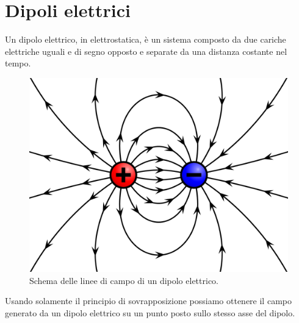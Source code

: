 \documentclass[
10pt, %
a4paper, %
oneside, %
headinclude,footinclude, %
BCOR5mm, %
]{scrartcl}
\begin{document}
\section{Dipoli elettrici}
\begin{definizione}
	Un dipolo elettrico, in elettrostatica, è un sistema composto da due cariche elettriche uguali e di segno opposto e separate da una distanza costante nel tempo.
\end{definizione}
\begin{figure}[h!]
	\centering
	\includegraphics[width=0.4\linewidth]{../images/dipolo_elettrico}
	\caption{Schema delle linee di campo di un dipolo elettrico.}
	\label{fig:dipoloelettrico}
\end{figure}
\FloatBarrier
Usando solamente il principio di sovrapposizione possiamo ottenere il campo generato da un dipolo elettrico su un punto posto sullo stesso asse del dipolo.
\end{document}
